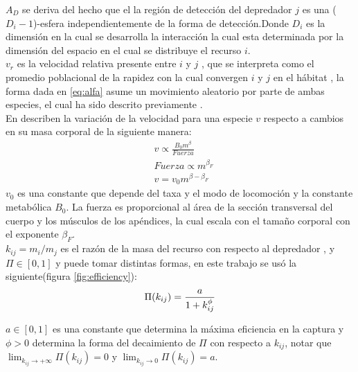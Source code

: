 $A_D$ se deriva del hecho que el la regi\'on de detecci\'on del depredador $j$ es una ($D_i-1$)-esfera independientemente de la forma de detecci\'on\citep{pawar2012dimensionality}.Donde $D_i$ es la dimensi\'on en la cual se desarrolla la interacci\'on la cual esta determinada por la dimensi\'on del espacio en el cual se distribuye el recurso $i$.\\
$v_r$ es la velocidad relativa presente entre $i$ y $j$ , que se interpreta como el promedio poblacional de la rapidez con la cual convergen $i$ y $j$ en el h\'abitat \citep[supinfo.]{pawar2012dimensionality} , la forma dada en \eqref{eq:alfa} asume un movimiento aleatorio por parte de ambas especies, el cual ha sido descrito previamente \citep{okubo2001diffusion}.\\
En \cite{pawar2012dimensionality} describen la variaci\'on de la velocidad para una especie $v$ respecto a cambios en su masa corporal de la siguiente manera:
\begin{equation}\label{eq:vel}
\begin{aligned}
&v \propto \frac{B_0 m^\beta}{Fuerza}\\
&Fuerza \propto m^{\beta_F} \\
&v = v_0m^{\beta - \beta_F}
\end{aligned}
\end{equation}
$v_0$ es una constante que depende del taxa y el modo de locomoci\'on y la constante metab\'olica $B_0$. La fuerza es proporcional al \'area de la secci\'on transversal del cuerpo y los m\'usculos de los ap\'endices, la cual escala con el tama\~no corporal con el exponente $\beta_F$.\\

$k_{ij}= m_i/m_j$ es el raz\'on de la masa del recurso con respecto al depredador , y $\Pi \in [0,1]$ y  puede tomar distintas formas\citep{weitz2006size}, en este trabajo se us\'o la siguiente(figura \ref{fig:efficiency}): 
\begin{equation}\label{eq:sr}
\Pi(k_{ij}) =\frac{a}{1+k_{ij}^\phi} \\
\end{equation}

$a \in [0,1] $ es una constante que determina la m\'axima eficiencia en la captura y $\phi > 0 $ determina la forma del decaimiento de $\Pi$ con respecto a $k_{ij}$, notar que $\lim_{k_{ij} \to +\infty}  \Pi(k_{ij}) = 0$ y  $\lim_{k_{ij} \to 0} \Pi(k_{ij}) = a $.

